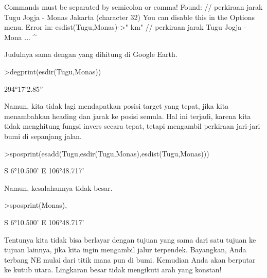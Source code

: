 \documentclass[12pt,Times new roman,letterpaper]{book}
\begin{document}
\begin{eulernootebook}
\begin{eulercomment}
\begin{eulercomment}
\begin{eulernootebook}
\begin{eulercomment}
\begin{eulercomment}
\begin{eulercomment}
\begin{eulercomment}
\begin{eulercomment}
\begin{eulercomment}
\begin{eulernotebook}
\begin{eulercomment}
\begin{eulercomment}
\begin{eulercomment}
\begin{eulercomment}
\begin{eulercomment}
\begin{euleroutput}
  Commands must be separated by semicolon or comma!
  Found:  // perkiraan jarak Tugu Jogja - Monas Jakarta (character 32)
  You can disable this in the Options menu.
  Error in:
  esdist(Tugu,Monas)->" km" // perkiraan jarak Tugu Jogja - Mona ...
                           ^
\end{euleroutput}
\begin{eulercomment}
Judulnya sama dengan yang dihitung di Google Earth.
\end{eulercomment}
\begin{eulerprompt}
>degprint(esdir(Tugu,Monas))
\end{eulerprompt}
\begin{euleroutput}
  294°17'2.85''
\end{euleroutput}
\begin{eulercomment}
Namun, kita tidak lagi mendapatkan posisi target yang tepat, jika kita
menambahkan heading dan jarak ke posisi semula. Hal ini terjadi,
karena kita tidak menghitung fungsi invers secara tepat, tetapi
mengambil perkiraan jari-jari bumi di sepanjang jalan.
\end{eulercomment}
\begin{eulerprompt}
>sposprint(esadd(Tugu,esdir(Tugu,Monas),esdist(Tugu,Monas)))
\end{eulerprompt}
\begin{euleroutput}
  S 6°10.500' E 106°48.717'
\end{euleroutput}
\begin{eulercomment}
Namun, kesalahannya tidak besar.
\end{eulercomment}
\begin{eulerprompt}
>sposprint(Monas),
\end{eulerprompt}
\begin{euleroutput}
  S 6°10.500' E 106°48.717'
\end{euleroutput}
\begin{eulercomment}
Tentunya kita tidak bisa berlayar dengan tujuan yang sama dari satu
tujuan ke tujuan lainnya, jika kita ingin mengambil jalur terpendek.
Bayangkan, Anda terbang NE mulai dari titik mana pun di bumi. Kemudian
Anda akan berputar ke kutub utara. Lingkaran besar tidak mengikuti
arah yang konstan!


\end{eulercomment}
\end{eulercomment}
\end{eulercomment}
\end{eulercomment}
\end{eulercomment}
\end{eulercomment}
\end{eulernotebook}
\end{eulercomment}
\end{eulercomment}
\end{eulercomment}
\end{eulercomment}
\end{eulercomment}
\end{eulercomment}
\end{eulernootebook}
\end{eulercomment}
\end{eulercomment}
\end{eulernootebook}
\end{document}
